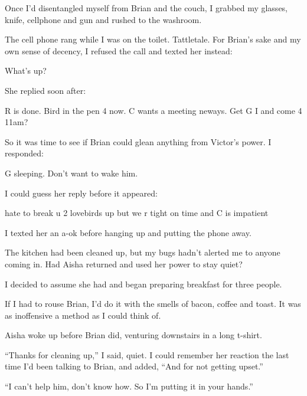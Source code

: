 Once I'd disentangled myself from Brian and the couch, I grabbed my glasses, knife, cellphone and gun and rushed to the washroom.



The cell phone rang while I was on the toilet.  Tattletale.  For Brian's sake and my own sense of decency, I refused the call and texted her instead:



What's up?



She replied soon after:



R is done.  Bird in the pen 4 now.  C wants a meeting neways.  Get G I and come 4 11am?



So it was time to see if Brian could glean anything from Victor's power.  I responded:



G sleeping.  Don't want to wake him.



I could guess her reply before it appeared:



hate to break u 2 lovebirds up but we r tight on time and C is impatient



I texted her an a-ok before hanging up and putting the phone away.



The kitchen had been cleaned up, but my bugs hadn't alerted me to anyone coming in.  Had Aisha returned and used her power to stay quiet?



I decided to assume she had and began preparing breakfast for three people.



If I had to rouse Brian, I'd do it with the smells of bacon, coffee and toast.  It was as inoffensive a method as I could think of.



Aisha woke up before Brian did, venturing downstairs in a long t-shirt.



``Thanks for cleaning up,'' I said, quiet.  I could remember her reaction the last time I'd been talking to Brian, and added, ``And for not getting upset.''



``I can't help him, don't know how.  So I'm putting it in your hands.''



